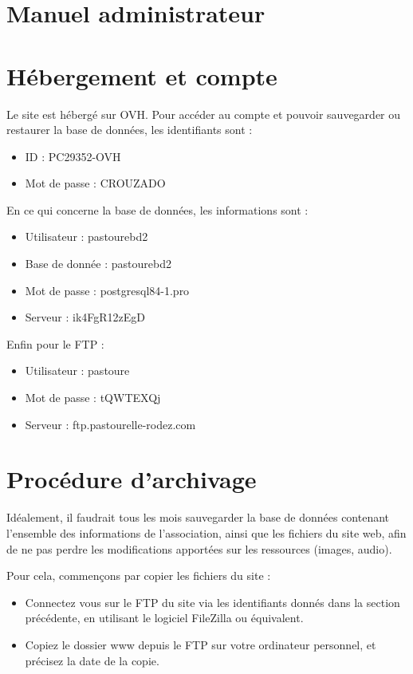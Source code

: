 \documentclass[11pt]{report}
\begin{document}
\section{Manuel administrateur}
\section{Hébergement et compte}
Le site est hébergé sur OVH. Pour accéder au compte et pouvoir sauvegarder ou
restaurer la base de données, les identifiants sont : \\
\begin{itemize}
  \item ID : PC29352-OVH
  \item Mot de passe : CROUZADO \\
\end{itemize}

\par En ce qui concerne la base de données, les informations sont : \\
\begin{itemize}
  \item Utilisateur : pastourebd2
  \item Base de donnée : pastourebd2
  \item Mot de passe :  postgresql84-1.pro
  \item Serveur : ik4FgR12zEgD \\
\end{itemize}

\par Enfin pour le FTP : \\
\begin{itemize}
  \item Utilisateur : pastoure
  \item Mot de passe :  tQWTEXQj
  \item Serveur : ftp.pastourelle-rodez.com
\end{itemize}


\section{Procédure d'archivage}
Idéalement, il faudrait tous les mois sauvegarder la base de données contenant
l'ensemble des informations de l'association, ainsi que les fichiers du site
web, afin de ne pas perdre les modifications apportées sur les ressources
(images, audio).

Pour cela, commençons par copier les fichiers du site  : 
\begin{itemize}
  \item Connectez vous sur le FTP du site via les identifiants donnés dans la
  section précédente, en utilisant le logiciel FileZilla ou équivalent.
  \item Copiez le dossier \og www \fg{} depuis le FTP sur votre ordinateur
  personnel, et précisez la date de la copie. \\
\end{itemize}
\end{document}
